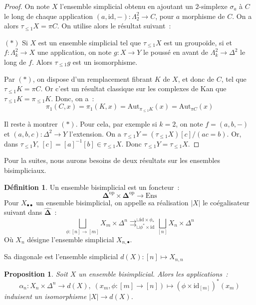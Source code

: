 \documentclass{amsart}
\theoremstyle{plain}
\newtheorem{prop}[theo]{Proposition}
\theoremstyle{definition}
\newtheorem{defi}[theo]{Définition}
\theoremstyle{remark}
\newcommand{\id}{\mathrm{id}}
\newcommand{\op}{^\mathrm{op}}
\newcommand{\Ens}{\mathrm{Ens}}
\newcommand{\DEns}{\widehat{\mathbf{\Delta}}}
\newcommand{\DCat}{\mathbf{\Delta}}
\newcommand{\xlongrightrightarrows}[2]{\mathop{\rightrightarrows}_{#1}^{#2}}
\newcommand{\coend}[2]{\bigsqcup_{\phi:[n]\ra [m]}{#1}_m\times {#2}^n\xlongrightrightarrows{\sqcup\phi^*\times\id}{\sqcup\id\times\phi_*}\bigsqcup_{[n]}{#1}_n\times {#2}^n}
\newcommand{\ra}{\rightarrow}
\newcommand{\lra}{\longrightarrow}
\begin{document}
\begin{proof}
  On note $X$ l'ensemble simplicial obtenu en ajoutant un $2$-simplexe $\sigma_a$ à $C$ le long de chaque application $(a,\id,-):\Lambda_2^2\ra C$,
  pour $a$ morphisme de $C$. On a alors $\tau_{\leq 1}X=\pi C$. On utilise alors le résultat suivant~:
  
  $(*)$ Si $X$ est un ensemble simplicial tel que $\tau_{\leq 1} X$ est un groupoïde, si et $f:\Lambda_k^2\ra X$ une application,
  on note $g:X\ra Y$ le poussé en avant de $\Lambda_k^2\ra \Delta^2$ le long de $f$. Alors $\tau_{\leq 1}g$ est un isomorphisme.
  
  Par $(*)$, on dispose d'un remplacement fibrant $K$ de $X$, et donc de $C$, tel que $\tau_{\leq 1} K=\pi C$. Or c'est un résultat classique sur
  les complexes de Kan que $\tau_{\leq 1} K= \pi_{\leq 1} K$. Donc, on a~:
  $$\pi_1(C,x)=\pi_1(K,x)=\mathrm{Aut}_{\pi_{\leq 1} K}(x)=\mathrm{Aut}_{\pi C}(x)$$

  Il reste à montrer $(*)$. Pour cela, par exemple si $k=2$, on note $f=(a,b,-)$ et $(a,b,c):\Delta^2\ra Y$ l'extension.
  On a $\tau_{\leq 1}Y=(\tau_{\leq 1}X)[c]/(ac=b)$. Or, dans $\tau_{\leq 1}Y$, $[c] = [a]^{-1}[b]\in \tau_{\leq 1}X$.
  Donc $\tau_{\leq 1}Y=\tau_{\leq 1}X$.
\end{proof}

Pour la suites, nous aurons besoins de deux résultats sur les ensembles bisimpliciaux.

\begin{defi}
  Un ensemble bisimplicial est un foncteur~:
  $$\DCat\op\times\DCat\op\lra \Ens$$
  Pour $X_{\bullet\bullet}$ un ensemble bisimplicial, on appelle sa réalisation $|X|$ le coégalisateur suivant dans $\DEns$~:
  $$\coend{X}{\Delta}$$
  Où $X_n$ désigne l'ensemble simplicial $X_{n,\bullet}$.
  
  Sa diagonale est l'ensemble simplicial $d(X):[n]\mapsto X_{n,n}$
\end{defi}

\begin{prop}
  Soit $X$ un ensemble bisimplicial. Alors les applications~:
  $$\alpha_n:X_n\times \Delta^n\ra d(X),\;(x_m,\phi:[m]\ra [n])\mapsto (\phi\times \id_{[m]})^*(x_m)$$
  induisent un isomorphisme $|X|\ra d(X)$.
\end{prop}
\end{document}
